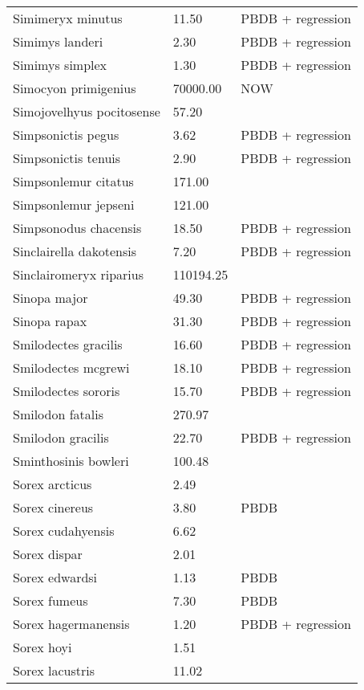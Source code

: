 \begin{longtable}{p{} p{} p{}}
    Simimeryx minutus & 11.50 & PBDB + regression \\ 
    Simimys landeri & 2.30 & PBDB + regression \\ 
    Simimys simplex & 1.30 & PBDB + regression \\ 
    Simocyon primigenius & 70000.00 & NOW \\ 
    Simojovelhyus pocitosense & 57.20 & \cite{Wang1999} \\ 
    Simpsonictis pegus & 3.62 & PBDB + regression \\ 
    Simpsonictis tenuis & 2.90 & PBDB + regression \\ 
    Simpsonlemur citatus & 171.00 & \cite{Soligo2006} \\ 
    Simpsonlemur jepseni & 121.00 & \cite{Soligo2006} \\ 
    Simpsonodus chacensis & 18.50 & PBDB + regression \\ 
    Sinclairella dakotensis & 7.20 & PBDB + regression \\ 
    Sinclairomeryx riparius & 110194.25 & \cite{Tomiya2013} \\ 
    Sinopa major & 49.30 & PBDB + regression \\ 
    Sinopa rapax & 31.30 & PBDB + regression \\ 
    Smilodectes gracilis & 16.60 & PBDB + regression \\ 
    Smilodectes mcgrewi & 18.10 & PBDB + regression \\ 
    Smilodectes sororis & 15.70 & PBDB + regression \\ 
    Smilodon fatalis & 270.97 & \cite{Smith2004} \\ 
    Smilodon gracilis & 22.70 & PBDB + regression \\ 
    Sminthosinis bowleri & 100.48 & \cite{Tomiya2013} \\ 
    Sorex arcticus & 2.49 & \cite{Smith2004} \\ 
    Sorex cinereus & 3.80 & PBDB \\ 
    Sorex cudahyensis & 6.62 & \cite{Tomiya2013} \\ 
    Sorex dispar & 2.01 & \cite{Smith2004} \\ 
    Sorex edwardsi & 1.13 & PBDB \\ 
    Sorex fumeus & 7.30 & PBDB \\ 
    Sorex hagermanensis & 1.20 & PBDB + regression \\ 
    Sorex hoyi & 1.51 & \cite{Smith2004} \\ 
    Sorex lacustris & 11.02 & \cite{Tomiya2013} \\ 

\end{longtable}
